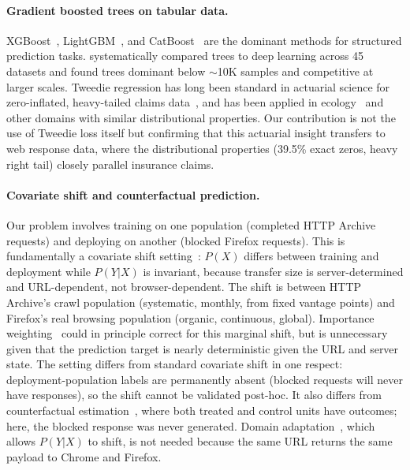 \documentclass[sigconf,nonacm]{acmart}
\begin{document}
\paragraph{Gradient boosted trees on tabular data.}
XGBoost~\cite{chen2016xgboost}, LightGBM~\cite{ke2017lightgbm}, and CatBoost~\cite{prokhorenkova2018catboost} are the dominant methods for structured prediction tasks.
\citet{grinsztajn2022tree} systematically compared trees to deep learning across 45 datasets and found trees dominant below $\sim$10K samples and competitive at larger scales.
Tweedie regression has long been standard in actuarial science for zero-inflated, heavy-tailed claims data~\cite{smyth2002tweedie,wuthrich2008stochastic}, and has been applied in ecology~\cite{shono2008tweedie} and other domains with similar distributional properties.
Our contribution is not the use of Tweedie loss itself but confirming that this actuarial insight transfers to web response data, where the distributional properties (39.5\% exact zeros, heavy right tail) closely parallel insurance claims.

\paragraph{Covariate shift and counterfactual prediction.}
Our problem involves training on one population (completed HTTP Archive requests) and deploying on another (blocked Firefox requests).
This is fundamentally a covariate shift setting~\cite{shimodaira2000covariate,sugiyama2007importance,quinonero2009dataset}: $P(X)$ differs between training and deployment while $P(Y|X)$ is invariant, because transfer size is server-determined and URL-dependent, not browser-dependent.
The shift is between HTTP Archive's crawl population (systematic, monthly, from fixed vantage points) and Firefox's real browsing population (organic, continuous, global).
Importance weighting~\cite{shimodaira2000covariate} could in principle correct for this marginal shift, but is unnecessary given that the prediction target is nearly deterministic given the URL and server state.
The setting differs from standard covariate shift in one respect: deployment-population labels are permanently absent (blocked requests will never have responses), so the shift cannot be validated post-hoc.
It also differs from counterfactual estimation~\cite{rosenbaum1983propensity,bottou2013counterfactual,johansson2016counterfactual}, where both treated and control units have outcomes; here, the blocked response was never generated.
Domain adaptation~\cite{bendavid2010domain,pan2010transfer}, which allows $P(Y|X)$ to shift, is not needed because the same URL returns the same payload to Chrome and Firefox.
\end{document}
